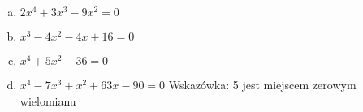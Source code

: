 \documentclass[12pt,a4paper]{article}
\begin{document}
	\begin{enumerate}[a)]
		\item $2x^4+3x^3-9x^2=0$
		\item $x^3-4x^2-4x+16=0$
		\item $x^4+5x^2-36=0$
		\item $x^4-7x^3+x^2+63x-90=0$\hspace{2cm} Wskazówka: 5 jest miejscem zerowym wielomianu
	\end{enumerate}
\end{document}
